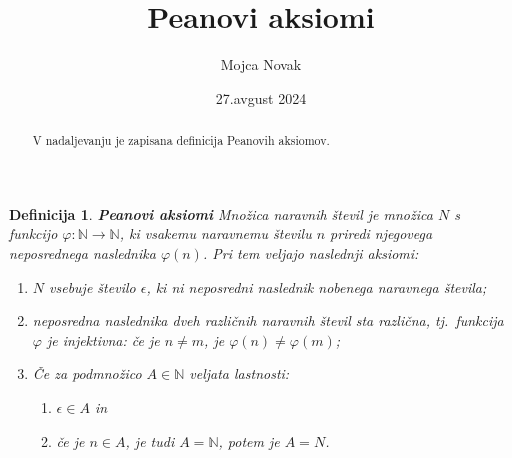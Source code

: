\documentclass[a4paper, 11pt]{article}
\title{Peanovi aksiomi}
\author{Mojca Novak}
\date{27.avgust 2024}
\newcommand{\N}{\mathbb{N}}
\newtheorem{definicija}{Definicija}}
\begin{document}
\maketitle

        
        \begin{abstract}
            V nadaljevanju je zapisana definicija Peanovih aksiomov.
        \end{abstract}

        
        \begin{definicija}
            \textbf{Peanovi aksiomi} \cite{}
            Množica naravnih števil je množica $N$ s funkcijo $\varphi : \N \rightarrow \N$, 
            ki vsakemu naravnemu številu $n$ priredi njegovega neposrednega naslednika $\varphi(n)$. 
            Pri tem veljajo naslednji aksiomi:
            \begin{enumerate}
                \item $N$ vsebuje število $\epsilon$, ki ni neposredni naslednik nobenega naravnega števila;
                \item neposredna naslednika dveh različnih naravnih števil sta različna, tj.\ funkcija $\varphi$ je injektivna: 
                če je $n \neq m$, je $\varphi(n) \neq \varphi(m)$;
                \item Če za podmnožico $A \in \N$ veljata lastnosti:
                \begin{enumerate}
                    \item $\epsilon \in A$ in
                    \item če je $n \in A$, je tudi $A = \N$,
                    potem je $A = N$.
                \end{enumerate}
            \end{enumerate}
        \end{definicija}

        \nocite{}
        
        
    
\end{document}
